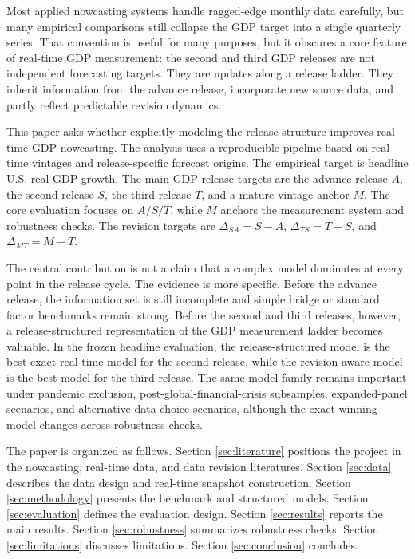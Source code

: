 \documentclass[12pt]{article}
\begin{document}
Most applied nowcasting systems handle ragged-edge monthly data carefully, but many empirical comparisons still collapse the GDP target into a single quarterly series. That convention is useful for many purposes, but it obscures a core feature of real-time GDP measurement: the second and third GDP releases are not independent forecasting targets. They are updates along a release ladder. They inherit information from the advance release, incorporate new source data, and partly reflect predictable revision dynamics.

This paper asks whether explicitly modeling the release structure improves real-time GDP nowcasting. The analysis uses a reproducible pipeline based on real-time vintages and release-specific forecast origins. The empirical target is headline U.S. real GDP growth. The main GDP release targets are the advance release $A$, the second release $S$, the third release $T$, and a mature-vintage anchor $M$. The core evaluation focuses on $A/S/T$, while $M$ anchors the measurement system and robustness checks. The revision targets are $\Delta_{SA}=S-A$, $\Delta_{TS}=T-S$, and $\Delta_{MT}=M-T$.

The central contribution is not a claim that a complex model dominates at every point in the release cycle. The evidence is more specific. Before the advance release, the information set is still incomplete and simple bridge or standard factor benchmarks remain strong. Before the second and third releases, however, a release-structured representation of the GDP measurement ladder becomes valuable. In the frozen headline evaluation, the release-structured model is the best exact real-time model for the second release, while the revision-aware model is the best model for the third release. The same model family remains important under pandemic exclusion, post-global-financial-crisis subsamples, expanded-panel scenarios, and alternative-data-choice scenarios, although the exact winning model changes across robustness checks.

The paper is organized as follows. Section \ref{sec:literature} positions the project in the nowcasting, real-time data, and data revision literatures. Section \ref{sec:data} describes the data design and real-time snapshot construction. Section \ref{sec:methodology} presents the benchmark and structured models. Section \ref{sec:evaluation} defines the evaluation design. Section \ref{sec:results} reports the main results. Section \ref{sec:robustness} summarizes robustness checks. Section \ref{sec:limitations} discusses limitations. Section \ref{sec:conclusion} concludes.
\end{document}
